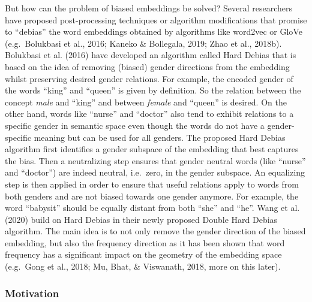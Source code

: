 \documentclass[
  english,
  man,floatsintext]{apa6}
\begin{document}
But how can the problem of biased embeddings be solved? Several researchers have proposed post-processing techniques or algorithm modifications that promise to \enquote{debias} the word embeddings obtained by algorithms like word2vec or GloVe (e.g.~Bolukbasi et al., 2016; Kaneko \& Bollegala, 2019; Zhao et al., 2018b).
Bolukbasi et al. (2016) have developed an algorithm called Hard Debias that is based on the idea of removing (biased) gender directions from the embedding whilst preserving desired gender relations. For example, the encoded gender of the words \enquote{king} and \enquote{queen} is given by definition. So the relation between the concept \emph{male} and \enquote{king} and between \emph{female} and \enquote{queen} is desired. On the other hand, words like \enquote{nurse} and \enquote{doctor} also tend to exhibit relations to a specific gender in semantic space even though the words do not have a gender-specific meaning but can be used for all genders. The proposed Hard Debias algorithm first identifies a gender subspace of the embedding that best captures the bias. Then a neutralizing step ensures that gender neutral words (like \enquote{nurse} and \enquote{doctor}) are indeed neutral, i.e.~zero, in the gender subspace. An equalizing step is then applied in order to ensure that useful relations apply to words from both genders and are not biased towards one gender anymore. For example, the word \enquote{babysit} should be equally distant from both \enquote{she} and \enquote{he}.
Wang et al. (2020) build on Hard Debias in their newly proposed Double Hard Debias algorithm. The main idea is to not only remove the gender direction of the biased embedding, but also the frequency direction as it has been shown that word frequency has a significant impact on the geometry of the embedding space (e.g.~Gong et al., 2018; Mu, Bhat, \& Viswanath, 2018, more on this later).

\hypertarget{motivation}{%
\subsubsection{Motivation}\label{motivation}}
\end{document}
